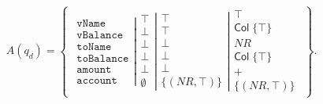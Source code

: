 \begin{align}
    A(q_d)=\left\{\begin{matrix}
                      \left.\begin{matrix}
                                \texttt{vName}\\
                                \texttt{vBalance}\\
                                \texttt{toName}\\
                                \texttt{toBalance}\\
                                \texttt{amount}\\
                                \texttt{account}
                      \end{matrix}\right|
                      \left.\begin{matrix}
                                \top\\
                                \bot\\
                                \bot\\
                                \bot\\
                                \bot\\
                                \emptyset
                      \end{matrix}\right|
                      \left.\begin{matrix}
                                \top\\
                                \top\\
                                \bot\\
                                \bot\\
                                \bot\\
                                \{(NR, \top)\}
                      \end{matrix}\right|
                      \begin{matrix}
                          \top\\
                          \mathsf{Col} \; \{\top\}\\
                          NR\\
                          \mathsf{Col} \; \{\top\}\\
                          +\\
                          \{(NR,\top)\}
                      \end{matrix}
    \end{matrix}\right\}.
\end{align}


